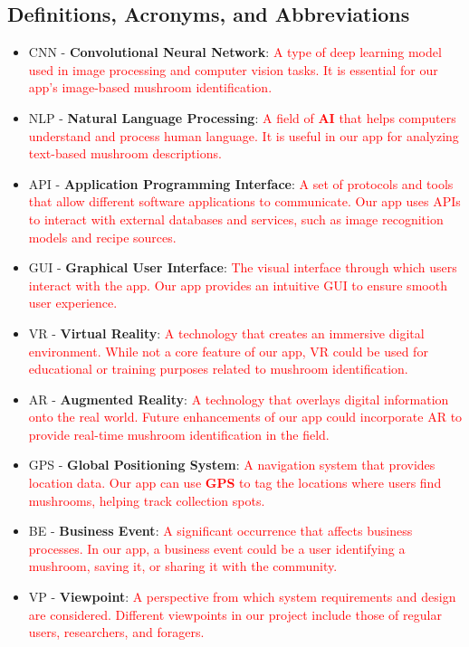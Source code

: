 \documentclass{article}
\begin{document}
\subsection{Definitions, Acronyms, and Abbreviations}
\label{sub:definitions_acronyms_and_abbreviations}
\begin{itemize}
    \item CNN - \textbf{Convolutional Neural Network}: \textcolor{red}{A type of deep learning model used in image processing and computer vision tasks. It is essential for our app{}’s image-based mushroom identification.}
    \item NLP - \textbf{Natural Language Processing}: \textcolor{red}{A field of \textbf{AI} that helps computers understand and process human language. It is useful in our app for analyzing text-based mushroom descriptions.}
    \item API - \textbf{Application Programming Interface}: \textcolor{red}{A set of protocols and tools that allow different software applications to communicate. Our app uses APIs to interact with external databases and services, such as image recognition models and recipe sources.}
    \item GUI - \textbf{Graphical User Interface}: \textcolor{red}{The visual interface through which users interact with the app. Our app provides an intuitive GUI to ensure smooth user experience.}
    \item VR - \textbf{Virtual Reality}: \textcolor{red}{A technology that creates an immersive digital environment. While not a core feature of our app, VR could be used for educational or training purposes related to mushroom identification.}
    \item AR - \textbf{Augmented Reality}: \textcolor{red}{A technology that overlays digital information onto the real world. Future enhancements of our app could incorporate AR to provide real-time mushroom identification in the field.}
    \item GPS - \textbf{Global Positioning System}: \textcolor{red}{A navigation system that provides location data. Our app can use \textbf{GPS} to tag the locations where users find mushrooms, helping track collection spots.}
    \item BE - \textbf{Business Event}: \textcolor{red}{A significant occurrence that affects business processes. In our app, a business event could be a user identifying a mushroom, saving it, or sharing it with the community.}
    \item VP - \textbf{Viewpoint}: \textcolor{red}{A perspective from which system requirements and design are considered. Different viewpoints in our project include those of regular users, researchers, and foragers.}

\end{itemize}
\end{document}
